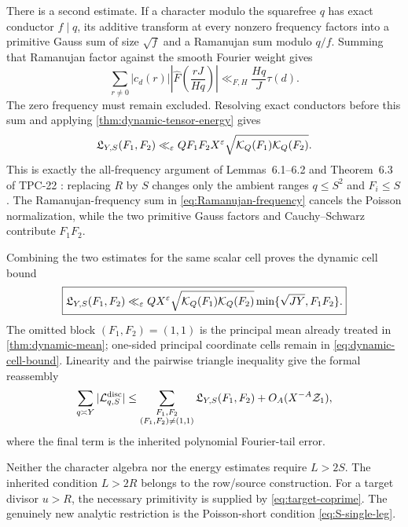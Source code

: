 There is a second estimate.  If a character modulo the squarefree
\(q\) has exact conductor \(f\mid q\), its additive transform at every
nonzero frequency factors into a primitive Gauss sum of size
\(\sqrt f\) and a Ramanujan sum modulo \(q/f\).  Summing that Ramanujan
factor against the smooth Fourier weight gives
\begin{equation}
 \sum_{r\ne0}|c_d(r)|
 \left|\widehat F\left(\frac{rJ}{Hq}\right)\right|
 \ll_{F,H} \frac{Hq}{J}\tau(d).
 \label{eq:Ramanujan-frequency}
\end{equation}
The zero frequency must remain excluded.  Resolving exact conductors
before this sum and applying \cref{thm:dynamic-tensor-energy} gives
\begin{equation}
\mathfrak L_{Y,S}(F_1,F_2)
 \ll_\varepsilon QF_1F_2X^\varepsilon
 \sqrt{\mathcal K_Q(F_1)\mathcal K_Q(F_2)}.
 \label{eq:dynamic-Gauss-route}
\end{equation}
This is exactly the all-frequency argument of Lemmas~6.1--6.2 and
Theorem~6.3 of TPC-22 \citep{WangTPC22}: replacing \(R\) by \(S\)
changes only the ambient ranges \(q\le S^2\) and \(F_i\le S\).  The
Ramanujan-frequency sum in \eqref{eq:Ramanujan-frequency} cancels the
Poisson normalization, while the two primitive Gauss factors and
Cauchy--Schwarz contribute \(F_1F_2\).

Combining the two estimates for the same scalar cell proves the dynamic
cell bound
\begin{equation}
 \boxed{
 \mathfrak L_{Y,S}(F_1,F_2)
 \ll_\varepsilon QX^\varepsilon
 \sqrt{\mathcal K_Q(F_1)\mathcal K_Q(F_2)}
 \min\{\sqrt{JY},F_1F_2\}.}
 \label{eq:dynamic-cell-bound}
\end{equation}
The omitted block \((F_1,F_2)=(1,1)\) is the principal mean already
treated in \cref{thm:dynamic-mean}; one-sided principal coordinate
cells remain in \eqref{eq:dynamic-cell-bound}.  Linearity and the
pairwise triangle inequality give the formal reassembly
\begin{equation}
 \sum_{q\asymp Y}|\mathcal L_{q,S}^{\rm disc}|
 \le
 \sum_{\substack{F_1,F_2\\(F_1,F_2)\ne(1,1)}}
 \mathfrak L_{Y,S}(F_1,F_2)
 +O_A(X^{-A}\mathcal Z_1),
 \label{eq:dynamic-cell-reassembly}
\end{equation}
where the final term is the inherited polynomial Fourier-tail error.

\begin{remark}
\label{rem:no-L2S}
Neither the character algebra nor the energy estimates require
\(L>2S\).  The inherited condition \(L>2R\) belongs to the row/source
construction.  For a target divisor \(u>R\), the necessary primitivity
is supplied by \eqref{eq:target-coprime}.  The genuinely new analytic
restriction is the Poisson-short condition \eqref{eq:S-single-leg}.
\end{remark}
